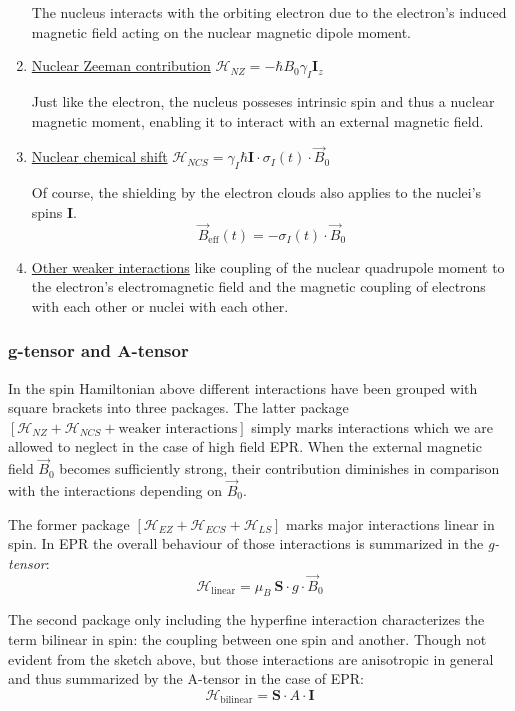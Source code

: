\documentclass[11.5pt,a4paper]{article}
\begin{document}
\begin{enumerate}
  The nucleus interacts with the orbiting electron due to the electron's induced magnetic field acting on the nuclear magnetic dipole moment. 

  \item \uline{Nuclear Zeeman contribution} $\mathcal{H}_{NZ} = -\hbar B_0 \gamma_I \mathbf{I}_z$
  
  Just like the electron, the nucleus posseses intrinsic spin and thus a nuclear magnetic moment, enabling it to interact with an external magnetic field.

  \item \uline{Nuclear chemical shift} $\mathcal{H}_{NCS} = \gamma_I \hbar \mathbf{I} \cdot \sigma_I(t) \cdot \vec{B}_0$
  
  Of course, the shielding by the electron clouds also applies to the nuclei's spins $\mathbf{I}$.
  \begin{equation}
    \vec{B}_\text{eff}(t) = - \sigma_I(t) \cdot \vec{B}_0
  \end{equation}

  \item \uline{Other weaker interactions} like coupling of the nuclear quadrupole moment to the electron's electromagnetic field and the magnetic coupling of electrons with each other or nuclei with each other.
\end{enumerate}

\subsubsection{g-tensor and A-tensor}
  In the spin Hamiltonian above different interactions have been grouped with square brackets into three packages. The latter package $\left[\mathcal{H}_{NZ} + \mathcal{H}_{NCS} + \text{weaker interactions}\right]$ simply marks interactions which we are allowed to neglect in the case of high field EPR. When the external magnetic field $\vec{B}_0$ becomes sufficiently strong, their contribution diminishes in comparison with the interactions depending on $\vec{B}_0$.

  The former package $\left[\mathcal{H}_{EZ} + \mathcal{H}_{ECS} + \mathcal{H}_{LS}\right]$ marks major interactions linear in spin. In EPR the overall behaviour of those interactions is summarized in the \emph{g-tensor}:
  \begin{equation}
    \mathcal{H}_\text{linear} = \mu_B\ \mathbf{S} \cdot g \cdot \vec{B}_0
  \end{equation}

  The second package only including the hyperfine interaction characterizes the term bilinear in spin: the coupling between one spin and another. Though not evident from the sketch above, but those interactions are anisotropic in general and thus summarized by the A-tensor in the case of EPR:
  \begin{equation}
    \mathcal{H}_\text{bilinear} = \mathbf{S} \cdot A \cdot \mathbf{I}
  \end{equation}
\end{document}
